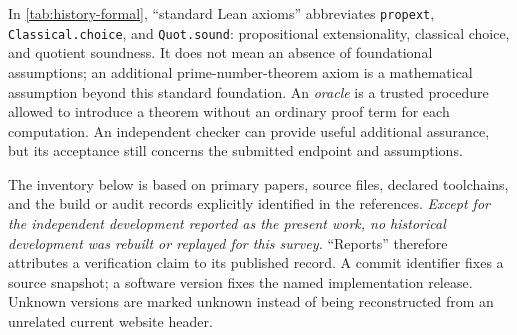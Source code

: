 \documentclass[11pt,letterpaper]{article}
\theoremstyle{definition}
\begin{document}
In \cref{tab:history-formal}, ``standard Lean axioms'' abbreviates
\texttt{propext}, \texttt{Classical.choice}, and \texttt{Quot.sound}:
propositional extensionality, classical choice, and quotient soundness.
It does not mean an absence of foundational assumptions;  an additional
prime-number-theorem axiom is a mathematical assumption beyond this
standard foundation.  An \emph{oracle} is a trusted procedure allowed to
introduce a theorem without an ordinary proof term for each computation.
An independent checker can provide useful additional assurance, but its
acceptance still concerns the submitted endpoint and assumptions.

The inventory below is based on primary papers, source files, declared
toolchains, and the build or audit records explicitly identified in the
references.  \emph{Except for the independent development reported as the present
work, no historical development was rebuilt or replayed for this
survey.}  ``Reports'' therefore attributes a verification
claim to its published record.  A commit identifier fixes a source
snapshot; a software version fixes the named implementation release.
Unknown versions are marked unknown instead of being reconstructed from
an unrelated current website header.
\end{document}
